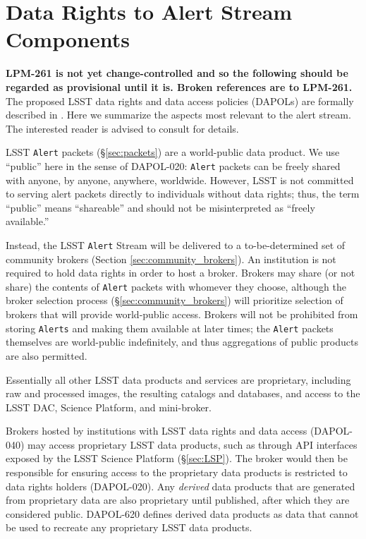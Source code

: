 \section{Data Rights to Alert Stream Components}\label{sec:data_rights}

\textbf{LPM-261 is not yet change-controlled and so the following should be regarded as provisional until it is. Broken references are to LPM-261.} 
The proposed LSST data rights and data access policies (DAPOLs) are formally described in . Here we summarize the aspects most relevant to the alert stream. The interested reader is advised to consult  for details.

LSST {\tt Alert} packets (\S \ref{sec:packets}) are a world-public data product.
We use ``public'' here in the sense of DAPOL-020:  \texttt{Alert} packets can be freely shared with anyone, by anyone, anywhere, worldwide.
However, LSST is not committed to serving alert packets directly to individuals without data rights;
thus, the term ``public'' means ``shareable'' and should not be misinterpreted as ``freely available.''

Instead, the LSST {\tt Alert} Stream will be delivered to a to-be-determined set of community brokers (Section \ref{sec:community_brokers}).
An institution is not required to hold data rights in order to host a broker.
Brokers may share (or not share) the contents of {\tt Alert} packets with whomever they choose, 
although the broker selection process (\S \ref{sec:community_brokers}) will prioritize selection of brokers that will provide world-public access.
Brokers will not be prohibited from storing {\tt Alerts} and making them available at later times;
the {\tt Alert} packets themselves are world-public indefinitely, and thus aggregations of public products are also permitted.

Essentially all other LSST data products and services are proprietary, including raw and processed images, the resulting catalogs and databases, and access to the LSST DAC, Science Platform, and mini-broker.

Brokers hosted by institutions with LSST data rights and data access (DAPOL-040) may access proprietary LSST data products, such as through API interfaces exposed by the LSST Science Platform (\S \ref{sec:LSP}).
The broker would then be responsible for ensuring access to the proprietary data products is restricted to data rights holders (DAPOL-020).
Any \textit{derived} data products that are generated from proprietary data are also proprietary until published, after which they are considered public. 
DAPOL-620 defines derived data products as data that cannot be used to recreate any proprietary LSST data products.

